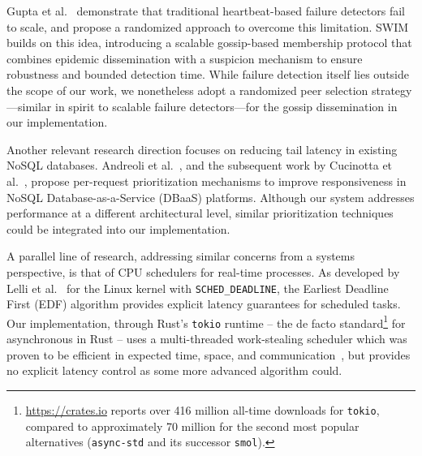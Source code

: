 Gupta et al.~\cite{FailureDetection} demonstrate that traditional heartbeat-based failure detectors fail to scale,
and propose a randomized approach to overcome this limitation.
SWIM~\cite{SWIM} builds on this idea, introducing a scalable gossip-based membership protocol
that combines epidemic dissemination with a suspicion mechanism to ensure robustness and bounded detection time.
While failure detection itself lies outside the scope of our work, we nonetheless adopt a randomized peer selection strategy—similar in spirit to scalable failure detectors—for the gossip dissemination in our implementation.


Another relevant research direction focuses on reducing tail latency in existing NoSQL databases.
Andreoli et al.~\cite{RTMongo}, and the subsequent work by Cucinotta et al.~\cite{PriorityMongoDB},
propose per-request prioritization mechanisms to improve responsiveness in NoSQL Database-as-a-Service (DBaaS) platforms.
Although our system addresses performance at a different architectural level, similar prioritization techniques could be integrated into our implementation.

A parallel line of research, addressing similar concerns from a systems perspective,
is that of CPU schedulers for real-time processes.
As developed by Lelli et al.~\cite{Deadline} for the Linux kernel with \texttt{SCHED\_DEADLINE},
the Earliest Deadline First (EDF) algorithm provides explicit latency guarantees for scheduled tasks.
Our implementation, through Rust’s \texttt{tokio} runtime -- the de facto standard\footnote{
    \url{https://crates.io} reports over 416 million all-time downloads for \texttt{tokio},
    compared to approximately 70 million for the second most popular alternatives (\texttt{async-std} and its successor \texttt{smol}).
} for asynchronous in Rust -- uses a multi-threaded work-stealing scheduler
which was proven to be efficient in expected time, space, and communication~\cite{WorkStealingScheduler},
but provides no explicit latency control as some more advanced algorithm could.

